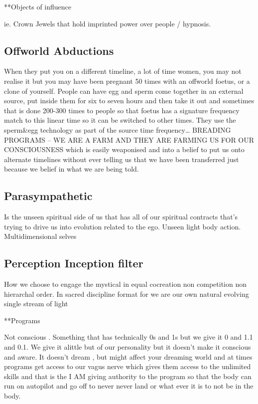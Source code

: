 **Objects of influence

ie. Crown Jewels that hold imprinted power over people / hypnosis.

\subsection{Offworld Abductions}\label{offworld-abductions}

When they put you on a different timeline, a lot of time women, you may
not realise it but you may have been pregnant 50 times with an offworld
foetus, or a clone of yourself. People can have egg and sperm come
together in an external source, put inside them for six to seven hours
and then take it out and sometimes that is done 200-300 times to people
so that foetus has a signature frequency match to this linear time so it
can be switched to other times. They use the sperm\&egg technology as
part of the source time frequency\ldots{} BREADING PROGRAMS -- WE ARE A
FARM AND THEY ARE FARMING US FOR OUR CONSCIOUSNESS which is easily
weaponised and into a belief to put us onto alternate timelines without
ever telling us that we have been transferred just because we belief in
what we are being told.

\subsection{Parasympathetic}\label{parasympathetic}

Is the unseen spiritual side of us that has all of our spiritual
contracts that's trying to drive us into evolution related to the ego.
Unseen light body action. Multidimensional selves

\subsection{Perception Inception
filter}\label{perception-inception-filter}

How we choose to engage the mystical in equal cocreation non competition
non hierarchal order. In sacred discipline format for we are our own
natural evolving single stream of light

**Programs

Not conscious . Something that has technically 0s and 1s but we give it
0 and 1.1 and 0.1. We give it alittle but of our personality but it
doesn't make it conscious and aware. It doesn't dream , but might affect
your dreaming world and at times programs get access to our vagus nerve
which gives them access to the unlimited skills and that is the I AM
giving authority to the program so that the body can run on autopilot
and go off to never never land or what ever it is to not be in the body.

